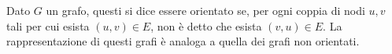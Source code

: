\documentclass{subfiles}
\begin{document}
Dato \(G\) un grafo, questi si dice essere orientato se, per ogni coppia di nodi \(u, v\) tali per cui esista \((u, v) \in E\),
non è detto che esista \((v, u) \in E\). La rappresentazione di questi grafi è analoga a quella dei grafi non orientati.


\end{document}
